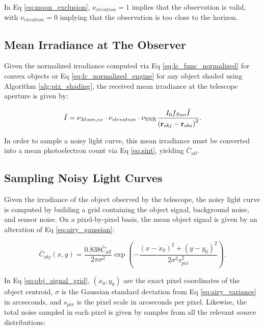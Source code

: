 In Eq \ref{eq:moon_exclusion}, $\nu_{elevation} = 1$ implies that the observation is valid, with $\nu_{elevation} = 0$ implying that the observation is too close to the horizon.

\subsection{Mean Irradiance at The Observer}

Given the normalized irradiance computed via Eq \ref{eq:lc_func_normalized} for convex objects or Eq \ref{eq:lc_normalized_engine} for any object shaded using Algorithm \ref{alg:pix_shading}, the received mean irradiance at the telescope aperture is given by:

\begin{equation} \label{eq:mean_irrad_at_aperture}
  \bar{I} = \nu_{Moon,ex} \cdot \nu_{elevation} \cdot \nu_{\mathrm{SNR}} \frac{I_0 f_{Sun} \hat{I}}{\left( \mathbf{r}_{obj} - \mathbf{r}_{obs} \right)^2}.
\end{equation}

In order to sample a noisy light curve, this mean irradiance must be converted into a mean photoelectron count via Eq \ref{eq:sint}, yielding $\bar{C}_{all}$.

\subsection{Sampling Noisy Light Curves} \label{sec:sampling_lcs}

Given the irradiance of the object observed by the telescope, the noisy light curve is computed by building a grid containing the object signal, background noise, and sensor noise. On a pixel-by-pixel basis, the mean object signal is given by an alteration of Eq \ref{eq:airy_gaussian}:

\begin{equation} \label{eq:obj_signal_grid}
  \bar{C}_{obj}(x, y) = \frac{0.838 \bar{C}_{all}}{2 \pi \sigma^2} \exp\left( - \frac{(x - x_0)^2 + (y - y_0)^2}{2 \sigma^2  s_{pix}^2} \right).
\end{equation}

In Eq \ref{eq:obj_signal_grid}, $\left(x_0, y_0\right)$ are the exact pixel coordinates of the object centroid, $\sigma$ is the Gaussian standard deviation from Eq \ref{eq:airy_variance} in arcseconds, and $s_{pix}$ is the pixel scale in arcseconds per pixel. Likewise, the total noise sampled in each pixel is given by samples from all the relevant source distributions:

